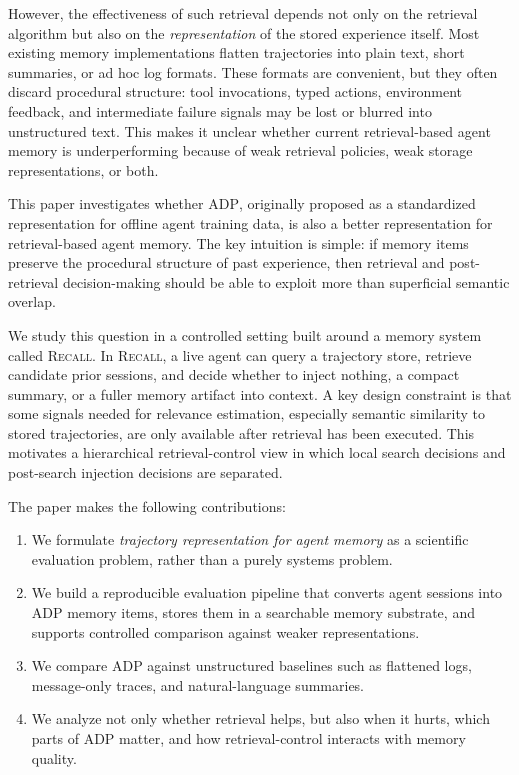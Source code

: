 \documentclass{article}
\newcommand{\Recall}{\textsc{Recall}}
\newcommand{\ADP}{\textsc{ADP}}
\begin{document}
However, the effectiveness of such retrieval depends not only on the retrieval algorithm but also on the
\emph{representation} of the stored experience itself.
Most existing memory implementations flatten trajectories into plain text, short summaries, or ad hoc log
formats.
These formats are convenient, but they often discard procedural structure:
tool invocations, typed actions, environment feedback, and intermediate failure signals may be lost or
blurred into unstructured text.
This makes it unclear whether current retrieval-based agent memory is underperforming because of weak
retrieval policies, weak storage representations, or both.

This paper investigates whether \ADP{}, originally proposed as a standardized representation for offline
agent training data, is also a better representation for retrieval-based agent memory.
The key intuition is simple:
if memory items preserve the procedural structure of past experience, then retrieval and post-retrieval
decision-making should be able to exploit more than superficial semantic overlap.

We study this question in a controlled setting built around a memory system called \Recall{}.
In \Recall{}, a live agent can query a trajectory store, retrieve candidate prior sessions, and decide
whether to inject nothing, a compact summary, or a fuller memory artifact into context.
A key design constraint is that some signals needed for relevance estimation, especially semantic
similarity to stored trajectories, are only available after retrieval has been executed.
This motivates a hierarchical retrieval-control view in which local search decisions and post-search
injection decisions are separated.

The paper makes the following contributions:
\begin{enumerate}[leftmargin=*,itemsep=2pt,topsep=2pt]
    \item We formulate \emph{trajectory representation for agent memory} as a scientific evaluation problem,
    rather than a purely systems problem.
    \item We build a reproducible evaluation pipeline that converts agent sessions into \ADP{} memory items,
    stores them in a searchable memory substrate, and supports controlled comparison against weaker
    representations.
    \item We compare \ADP{} against unstructured baselines such as flattened logs, message-only traces, and
    natural-language summaries.
    \item We analyze not only whether retrieval helps, but also when it hurts, which parts of \ADP{} matter,
    and how retrieval-control interacts with memory quality.
\end{enumerate}
\end{document}
